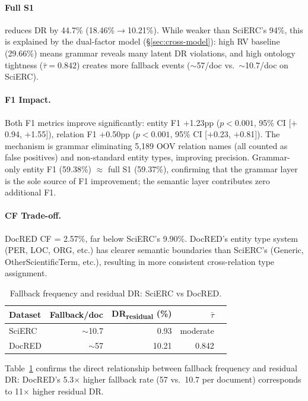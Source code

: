 \documentclass[11pt,a4paper]{article}
\begin{document}
\paragraph{Full S1} reduces DR by 44.7\% (18.46\%$\to$10.21\%). While weaker than SciERC's 94\%, this is explained by the dual-factor model (\S\ref{sec:cross-model}): high RV baseline (29.66\%) means grammar reveals many latent DR violations, and high ontology tightness ($\bar{\tau}{=}0.842$) creates more fallback events ($\sim$57/doc vs.\ $\sim$10.7/doc on SciERC).

\paragraph{F1 Impact.} Both F1 metrics improve significantly: entity F1 $+$1.23pp ($p{<}0.001$, 95\% CI [$+$0.94, $+$1.55]), relation F1 $+$0.50pp ($p{<}0.001$, 95\% CI [$+$0.23, $+$0.81]). The mechanism is grammar eliminating 5,189 OOV relation names (all counted as false positives) and non-standard entity types, improving precision. Grammar-only entity F1 (59.38\%) $\approx$ full S1 (59.37\%), confirming that the grammar layer is the sole source of F1 improvement; the semantic layer contributes zero additional F1.

\paragraph{CF Trade-off.} DocRED CF = 2.57\%, far below SciERC's 9.90\%. DocRED's entity type system (PER, LOC, ORG, etc.) has clearer semantic boundaries than SciERC's (Generic, OtherScientificTerm, etc.), resulting in more consistent cross-relation type assignment.


\begin{table}[t]
\centering
\small
\caption{Fallback frequency and residual DR: SciERC vs DocRED.}
\label{tab:fallback}
\begin{tabular}{lrrrr}
\toprule
\textbf{Dataset} & \textbf{Fallback/doc} & \textbf{DR\textsubscript{residual} (\%)} & \textbf{$\bar{\tau}$} \\
\midrule
SciERC & $\sim$10.7 & 0.93 & moderate \\
DocRED & $\sim$57 & 10.21 & 0.842 \\
\bottomrule
\end{tabular}
\end{table}

Table~\ref{tab:fallback} confirms the direct relationship between fallback frequency and residual DR: DocRED's 5.3$\times$ higher fallback rate (57 vs.\ 10.7 per document) corresponds to 11$\times$ higher residual DR.
\end{document}
